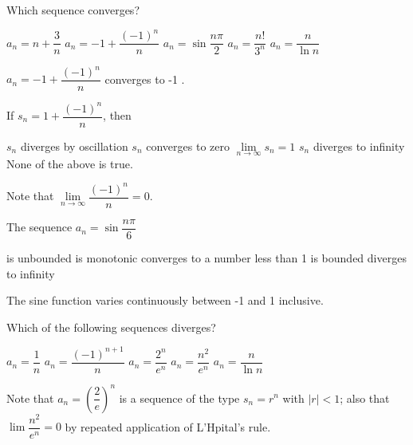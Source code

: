 
\question
Which sequence converges?
\begin{choices}
  \choice $a_{n}=n+\dfrac{3}{n}$
  \CorrectChoice $a_{n}=-1+\dfrac{(-1)^{n}}{n}$
  \choice $a_{n}=\sin \dfrac{n \pi}{2}$
  \choice $a_{n}=\dfrac{n!}{3^{n}}$
  \choice $a_{n}=\dfrac{n}{\ln n}$
\end{choices}
\begin{solution}
$a_{n}=-1+\dfrac{(-1)^{n}}{n}$ converges to -1 .
\end{solution}

\question
If $s_{n}=1+\dfrac{(-1)^{n}}{n}$, then
\begin{choices}
  \choice $s_{n}$ diverges by oscillation
  \choice $s_{n}$ converges to zero
  \CorrectChoice $\lim\limits_{n \to \infty} s_{n}=1$
  \choice $s_{n}$ diverges to infinity
  \choice None of the above is true.
\end{choices}
\begin{solution}
Note that $\lim\limits_{n \to \infty} \dfrac{(-1)^{n}}{n}=0$.
\end{solution}

\question
The sequence $a_{n}=\sin \dfrac{n \pi}{6}$
\begin{choices}
  \choice is unbounded
  \choice is monotonic
  \choice converges to a number less than 1
  \CorrectChoice is bounded
  \choice diverges to infinity
\end{choices}
\begin{solution}
The sine function varies continuously between -1 and 1 inclusive.
\end{solution}




\newpage




\question
Which of the following sequences diverges?
\begin{choices}
  \choice $a_{n}=\dfrac{1}{n}$
  \choice $a_{n}=\dfrac{(-1)^{n+1}}{n}$
  \choice $a_{n}=\dfrac{2^{n}}{e^{n}}$
  \choice $a_{n}=\dfrac{n^{2}}{e^{n}}$
  \CorrectChoice $a_{n}=\dfrac{n}{\ln n}$
\end{choices}
\begin{solution}
Note that $a_{n}=\left(\dfrac{2}{e}\right)^{n}$ is a sequence of the type $s_{n}=r^{n}$ with $|r|<1$; also that $\lim \dfrac{n^{2}}{e^{n}}=0$ by repeated application of L'Hpital's rule.
\end{solution}

